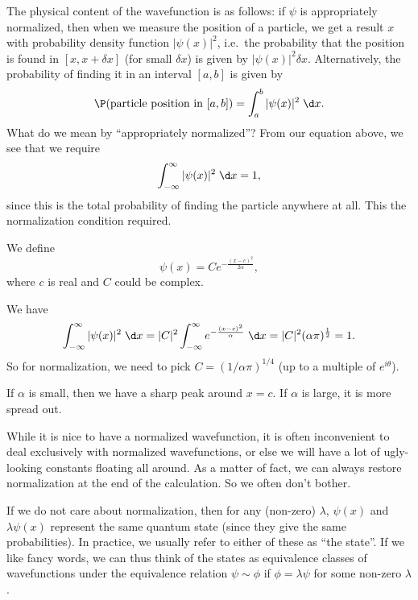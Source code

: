 \documentclass[a4paper]{article}
\begin{document}
The physical content of the wavefunction is as follows: if $\psi$ is appropriately normalized, then when we measure the position of a particle, we get a result $x$ with probability density function $|\psi(x)|^2$, i.e.\ the probability that the position is found in $[x, x + \delta x]$ (for small $\delta x$) is given by $|\psi(x)|^2 \delta x$. Alternatively, the probability of finding it in an interval $[a, b]$ is given by
\[
  \P(\text{particle position in }[a, b]) = \int_a^b |\psi(x)|^2 \;\d x.
\]
What do we mean by ``appropriately normalized''? From our equation above, we see that we require
\[
  \int_{-\infty}^\infty |\psi(x)|^2\;\d x = 1,
\]
since this is the total probability of finding the particle anywhere at all. This the normalization condition required.

\begin{eg}
  We define
  \[
    \psi(x) = C e^{-\frac{(x - c)^2}{2\alpha}},
  \]
  where $c$ is real and $C$ could be complex.
  \begin{center}
  \end{center}
  We have
  \[
    \int_{-\infty}^\infty |\psi(x)|^2 \;\d x = |C|^2 \int_{-\infty}^{\infty}e^{-\frac{(x - c)^2}{\alpha}} \;\d x = |C|^2 (\alpha \pi)^{\frac{1}{2}} = 1.
  \]
  So for normalization, we need to pick $C = (1/\alpha \pi)^{1/4}$ (up to a multiple of $e^{i\theta}$).

  If $\alpha$ is small, then we have a sharp peak around $x = c$. If $\alpha$ is large, it is more spread out.
\end{eg}
While it is nice to have a normalized wavefunction, it is often inconvenient to deal exclusively with normalized wavefunctions, or else we will have a lot of ugly-looking constants floating all around. As a matter of fact, we can always restore normalization at the end of the calculation. So we often don't bother.

If we do not care about normalization, then for any (non-zero) $\lambda$, $\psi(x)$ and $\lambda \psi(x)$ represent the same quantum state (since they give the same probabilities). In practice, we usually refer to either of these as ``the state''. If we like fancy words, we can thus think of the states as equivalence classes of wavefunctions under the equivalence relation $\psi \sim \phi$ if $\phi = \lambda \psi$ for some non-zero $\lambda$.
\end{document}
